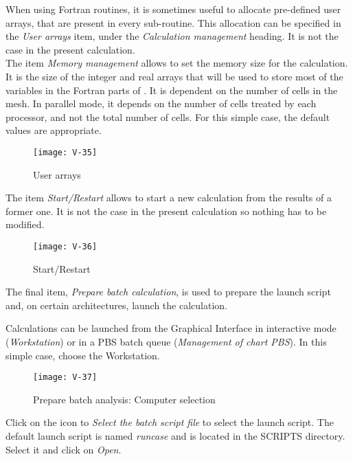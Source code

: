 \clearpage
When using Fortran routines, it is sometimes useful to allocate pre-defined user
arrays, that are present in every sub-routine. This allocation can be specified
in the {\itshape User arrays} item, under the {\itshape Calculation management}
heading. It is not the case in the present calculation.\\

The item {\itshape Memory management} allows to set the
memory size for the calculation. It is the size of the integer and real arrays that will be used to store most of the variables in the Fortran parts of \CS.
It is dependent on the number of cells in the mesh. In parallel mode, it depends
on the number of cells treated by each processor, and not the total number of
cells. For this simple case, the default values are appropriate.

\begin{figure}[ht]
\begin{center}
\texttt{[image: V-35]}
\caption{User arrays}
\label{fig39_e1}
\end{center}
\end{figure}


\clearpage
The item {\itshape Start/Restart} allows to start a new calculation from the
results of a former one. It is not the case in the present calculation so
nothing has to be modified.

\begin{figure}[ht]
\begin{center}
\texttt{[image: V-36]}
\caption{Start/Restart}
\label{fig40_e1}
\end{center}
\end{figure}


\clearpage
The final item, {\itshape Prepare batch calculation}, is used to prepare the launch
script and, on certain architectures, launch the calculation.

Calculations can be launched from the Graphical Interface in interactive mode
({\itshape Workstation}) or in a PBS batch queue ({\itshape Management of chart
PBS}). In this simple case, choose the Workstation.

\begin{figure}[ht]
\begin{center}
\texttt{[image: V-37]}
\caption{Prepare batch analysis: Computer selection}
\label{fig41_e1}
\end{center}
\end{figure}


\clearpage
Click on the icon to {\itshape Select the batch script file} to select the
launch script. The default launch script is named {\itshape runcase} and is
located in the SCRIPTS directory. Select it and click on {\itshape Open}.

